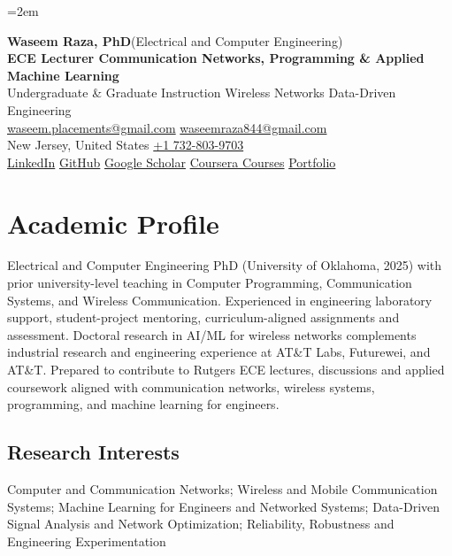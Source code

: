 \documentclass[9pt,letterpaper]{extarticle}
\begin{document}
\emergencystretch=2em
\begin{center}
{\LARGE\bfseries Waseem Raza, PhD}{\normalsize\mdseries \enspace (Electrical and Computer Engineering)}\\[2pt]
{\large\bfseries ECE Lecturer \textbar{} Communication Networks, Programming \& Applied Machine Learning}\\[1pt]
{\small Undergraduate \& Graduate Instruction \textbar{} Wireless Networks \textbar{} Data-Driven Engineering}\\[3pt]
{\footnotesize {}\enspace \href{mailto:waseem.placements@gmail.com}{waseem.placements@gmail.com} \textbar{} \href{mailto:waseemraza844@gmail.com}{waseemraza844@gmail.com}\\[1pt]New Jersey, United States \quad {}\enspace \href{tel:+17328039703}{+1 732-803-9703}\\[1pt]\href{https://www.linkedin.com/in/waseem-raza-phd-9a737858/}{LinkedIn} \textbar{} \href{https://github.com/WaseemRaza844}{GitHub} \textbar{} \href{https://scholar.google.com/citations?user=d58Drr0AAAAJ\&hl=en}{Google Scholar} \textbar{} \href{https://waseemraza844.github.io/portfolio/learning.html}{Coursera Courses} \textbar{} \href{https://waseemraza844.github.io/portfolio/}{Portfolio}}
\end{center}
\vspace{-5pt}
\section{Academic Profile}
Electrical and Computer Engineering PhD (University of Oklahoma, 2025) with prior university-level teaching in Computer Programming, Communication Systems, and Wireless Communication. Experienced in engineering laboratory support, student-project mentoring, curriculum-aligned assignments and assessment. Doctoral research in AI/ML for wireless networks complements industrial research and engineering experience at AT\&T Labs, Futurewei, and AT\&T. Prepared to contribute to Rutgers ECE lectures, discussions and applied coursework aligned with communication networks, wireless systems, programming, and machine learning for engineers.
\subsection{Research Interests}
Computer and Communication Networks; Wireless and Mobile Communication Systems; Machine Learning for Engineers and Networked Systems; Data-Driven Signal Analysis and Network Optimization; Reliability, Robustness and Engineering Experimentation\par
{}
\end{document}
